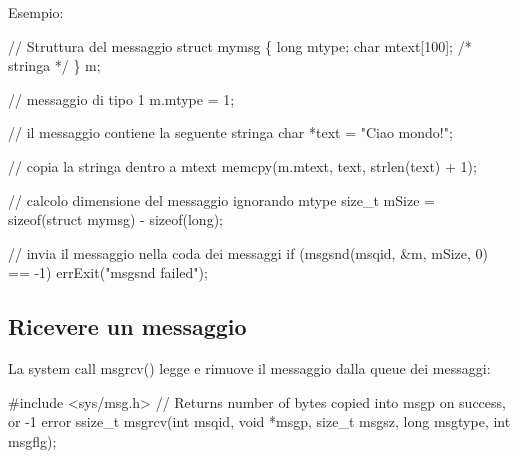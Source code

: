Esempio\+: 
\begin{DoxyCode}
\textcolor{comment}{// Struttura del messaggio}
\textcolor{keyword}{struct }mymsg \{
    \textcolor{keywordtype}{long} mtype;
    \textcolor{keywordtype}{char} mtext[100]; \textcolor{comment}{/* stringa */}
\} m;

\textcolor{comment}{// messaggio di tipo 1}
m.mtype = 1;

\textcolor{comment}{// il messaggio contiene la seguente stringa}
\textcolor{keywordtype}{char} *text = \textcolor{stringliteral}{"Ciao mondo!"};

\textcolor{comment}{// copia la stringa dentro a mtext}
memcpy(m.mtext, text, strlen(text) + 1);

\textcolor{comment}{// calcolo dimensione del messaggio ignorando mtype}
\textcolor{keywordtype}{size\_t} mSize = \textcolor{keyword}{sizeof}(\textcolor{keyword}{struct }mymsg) - sizeof(long);

\textcolor{comment}{// invia il messaggio nella coda dei messaggi}
\textcolor{keywordflow}{if} (msgsnd(msqid, &m, mSize, 0) == -1)
    errExit(\textcolor{stringliteral}{"msgsnd failed"});
\end{DoxyCode}


\subsection*{Ricevere un messaggio}

La system call {\ttfamily msgrcv()} legge e rimuove il messaggio dalla queue dei messaggi\+:


\begin{DoxyCode}
\textcolor{preprocessor}{#include <sys/msg.h>}
\textcolor{comment}{// Returns number of bytes copied into msgp on success, or -1 error}
ssize\_t msgrcv(\textcolor{keywordtype}{int} msqid, \textcolor{keywordtype}{void} *msgp, \textcolor{keywordtype}{size\_t} msgsz, \textcolor{keywordtype}{long} msgtype, \textcolor{keywordtype}{int} msgflg);
\end{DoxyCode}


